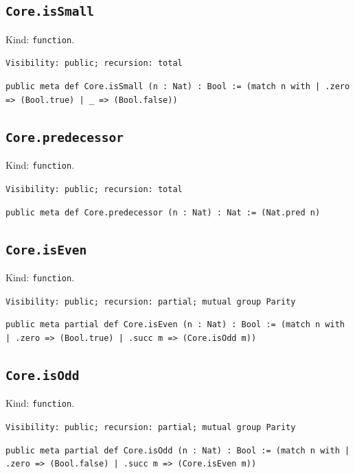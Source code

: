 \documentclass[11pt]{article}
\begin{document}
\subsection*{\texttt{Core.isSmall}}
\noindent Kind: \texttt{function}.\par
\noindent \texttt{Visibility: public; recursion: total}\par
\noindent \texttt{public meta def Core.isSmall (n : Nat) : Bool :=   (match n with | .zero => (Bool.true) | \_ => (Bool.false))}\par
\subsection*{\texttt{Core.predecessor}}
\noindent Kind: \texttt{function}.\par
\noindent \texttt{Visibility: public; recursion: total}\par
\noindent \texttt{public meta def Core.predecessor (n : Nat) : Nat :=   (Nat.pred n)}\par
\subsection*{\texttt{Core.isEven}}
\noindent Kind: \texttt{function}.\par
\noindent \texttt{Visibility: public; recursion: partial; mutual group Parity}\par
\noindent \texttt{public meta partial def Core.isEven (n : Nat) : Bool :=   (match n with | .zero => (Bool.true) | .succ m => (Core.isOdd m))}\par
\subsection*{\texttt{Core.isOdd}}
\noindent Kind: \texttt{function}.\par
\noindent \texttt{Visibility: public; recursion: partial; mutual group Parity}\par
\noindent \texttt{public meta partial def Core.isOdd (n : Nat) : Bool :=   (match n with | .zero => (Bool.false) | .succ m => (Core.isEven m))}\par
\end{document}
